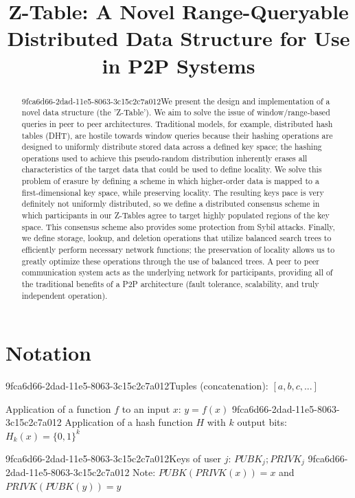 \documentclass[12pt]{article}
\title{Z-Table: A Novel Range-Queryable Distributed Data Structure for Use in P2P Systems}
\begin{document}
\maketitle

\begin{abstract}
9fca6d66-2dad-11e5-8063-3c15c2c7a012We present the design and implementation of a novel data structure (the 'Z-Table'). We aim to solve the issue of window/range-based queries in peer to peer architectures. Traditional models, for example,  distributed hash tables (DHT), are hostile towards window queries because their hashing operations are designed to uniformly distribute stored data across a defined key space; the hashing operations used to achieve this pseudo-random distribution inherently erases all characteristics of the target data that could be used to define locality. We solve this problem of erasure by defining a scheme in which higher-order data is mapped to a first-dimensional key space, while preserving locality. The resulting keys pace is very definitely not uniformly distributed, so we define a distributed consensus scheme in which participants in our Z-Tables agree to target highly populated regions of the key space. This consensus scheme also provides some protection from Sybil attacks. Finally, we define storage, lookup, and deletion operations that utilize balanced search trees to efficiently perform necessary network functions; the preservation of locality allows us to greatly optimize these operations through the use of balanced trees. A peer to peer communication system acts as the underlying network for participants, providing all of the traditional benefits of a P2P architecture (fault tolerance, scalability, and truly independent operation).
\end{abstract}

\section{Notation}

9fca6d66-2dad-11e5-8063-3c15c2c7a012Tuples (concatenation): $[a,b,c,...]$

Application of a function $f$ to an input $x$: $y=f(x)$
9fca6d66-2dad-11e5-8063-3c15c2c7a012
Application of a hash function $H$ with $k$ output bits: $H_{k}(x) = \{0,1\}^k$

9fca6d66-2dad-11e5-8063-3c15c2c7a012Keys of user $j$: $ PUBK_j; PRIVK_j $
9fca6d66-2dad-11e5-8063-3c15c2c7a012
Note: $PUBK(PRIVK(x)) = x$ and $PRIVK(PUBK(y)) = y$~
\end{document}
